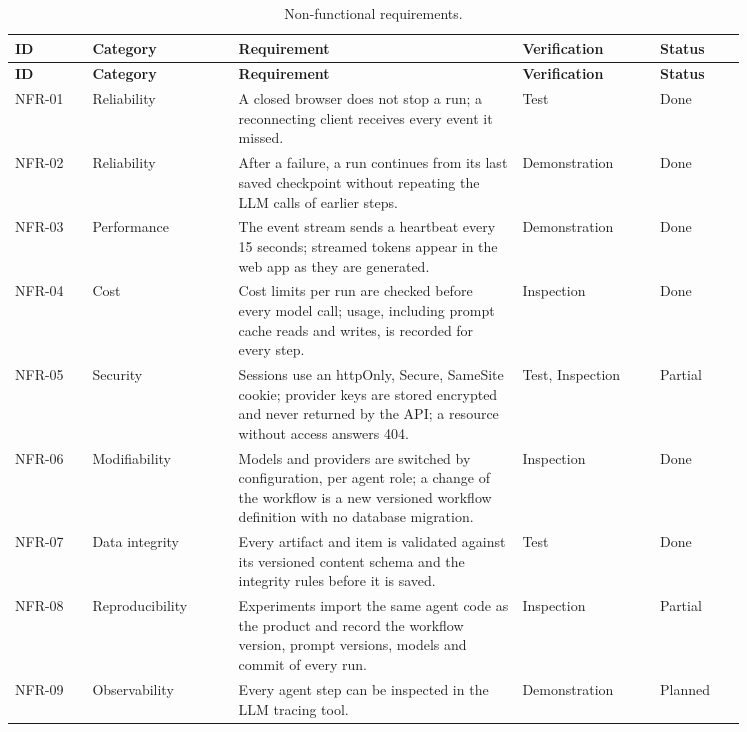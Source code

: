 \begingroup{}\small
\begin{longtable}{|p{0.09\linewidth}|p{0.17\linewidth}|p{0.33\linewidth}|p{0.16\linewidth}|p{0.1\linewidth}|}
    \caption{Non-functional requirements.}
    \label{tab:sd-nfr} \\
    \hline
    \textbf{ID} & \textbf{Category} & \textbf{Requirement} & \textbf{Verification} & \textbf{Status} \\
    \hline
    \endfirsthead
    \hline
    \textbf{ID} & \textbf{Category} & \textbf{Requirement} & \textbf{Verification} & \textbf{Status} \\
    \hline
    \endhead
    NFR-01 & Reliability & A closed browser does not stop a run; a reconnecting client receives every event it missed. & Test & Done \\ \hline
    NFR-02 & Reliability & After a failure, a run continues from its last saved checkpoint without repeating the LLM calls of earlier steps. & Demonstration & Done \\ \hline
    NFR-03 & Performance & The event stream sends a heartbeat every 15 seconds; streamed tokens appear in the web app as they are generated. & Demonstration & Done \\ \hline
    NFR-04 & Cost & Cost limits per run are checked before every model call; usage, including prompt cache reads and writes, is recorded for every step. & Inspection & Done \\ \hline
    NFR-05 & Security & Sessions use an httpOnly, Secure, SameSite cookie; provider keys are stored encrypted and never returned by the API; a resource without access answers 404. & Test, Inspection & Partial \\ \hline
    NFR-06 & Modifiability & Models and providers are switched by configuration, per agent role; a change of the workflow is a new versioned workflow definition with no database migration. & Inspection & Done \\ \hline
    NFR-07 & Data integrity & Every artifact and item is validated against its versioned content schema and the integrity rules before it is saved. & Test & Done \\ \hline
    NFR-08 & Reproducibility & Experiments import the same agent code as the product and record the workflow version, prompt versions, models and commit of every run. & Inspection & Partial \\ \hline
    NFR-09 & Observability & Every agent step can be inspected in the LLM tracing tool. & Demonstration & Planned \\ \hline

\end{longtable}
